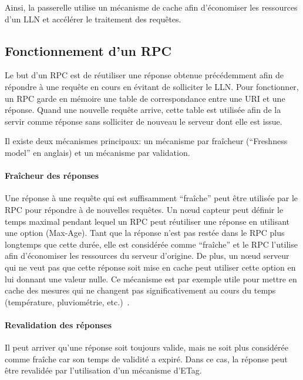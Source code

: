 Ainsi, la passerelle utilise un mécanisme de cache afin d'économiser les ressources d'un \ac{LLN} et accélérer le traitement des requêtes.

\subsection{Fonctionnement d'un \ac{RPC}}

Le but d'un \ac{RPC} est de réutiliser une réponse obtenue précédemment afin de répondre à une requête en cours en évitant de solliciter le \ac{LLN}.
Pour fonctionner, un \ac{RPC} garde en mémoire une table de correspondance entre une \ac{URI} et une réponse.
Quand une nouvelle requête arrive, cette table est utilisée afin de la servir comme réponse sans solliciter de nouveau le serveur dont elle est issue.

Il existe deux mécanismes principaux: un mécanisme par fraîcheur (``Freshness model'' en anglais) et un mécanisme par validation.

\paragraph{Fraîcheur des réponses}

Une réponse à une requête qui est suffisamment ``fraîche'' peut être utilisée par le \ac{RPC} pour répondre à de nouvelles requêtes.
Un nœud capteur peut définir le temps maximal pendant lequel un \ac{RPC} peut réutiliser une réponse en utilisant une option (Max-Age).
Tant que la réponse n'est pas restée dans le \ac{RPC} plus longtemps que cette durée, elle est considérée comme ``fraîche'' et le \ac{RPC} l'utilise afin d'économiser les ressources du serveur d'origine.
De plus, un nœud serveur qui ne veut pas que cette réponse soit mise en cache peut utiliser cette option en lui donnant une valeur nulle.
Ce mécanisme est par exemple utile pour mettre en cache des mesures qui ne changent pas significativement au cours du temps (température, pluviométrie, etc.)~\cite{cachingbestpractices}.

\paragraph{Revalidation des réponses}

Il peut arriver qu'une réponse soit toujours valide, mais ne soit plus considérée comme fraîche car son temps de validité a expiré.
Dans ce cas, la réponse peut être revalidée par l'utilisation d'un mécanisme d'\ac{ETag}.

